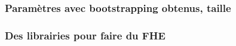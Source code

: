 \documentclass[15pt,usenames,dvipsnames]{beamer}
\begin{document}

\begin{frame} 
\frametitle{Paramètres avec bootstrapping obtenus, taille}
\end{frame} 


\begin{frame} 
\frametitle{Des librairies pour faire du FHE}
\end{frame} 


% 	    

    

\end{document}
